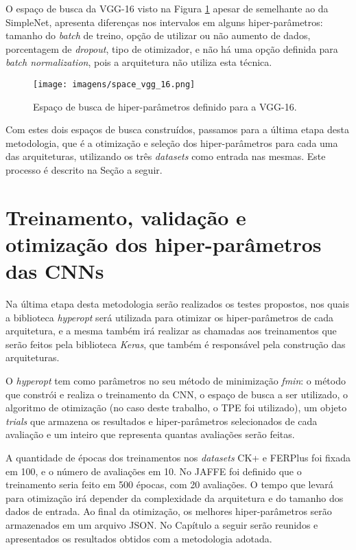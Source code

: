 \documentclass[
12pt,       %
openright,      %
oneside,      %
a4paper,      %
english,      %
french,       %
spanish,      %
brazil        %
]{abntex2}
\begin{document}
O espaço de busca da VGG-16 visto na Figura \ref{fig:space_vgg_16} apesar de semelhante ao da SimpleNet, apresenta diferenças nos intervalos em alguns hiper-parâmetros: tamanho do \textit{batch} de treino, opção de utilizar ou não aumento de dados, porcentagem de \textit{dropout}, tipo de otimizador, e não há uma opção definida para \textit{batch normalization}, pois a arquitetura não utiliza esta técnica.

\begin{figure}[ht]
\centering
\caption{Espaço de busca de hiper-parâmetros definido para a VGG-16.}
\texttt{[image: imagens/space\_vgg\_16.png]}
\label{fig:space_vgg_16}
\end{figure}

Com estes dois espaços de busca construídos, passamos para a última etapa desta metodologia, que é a otimização e seleção dos hiper-parâmetros para cada uma das arquiteturas, utilizando os três \textit{datasets} como entrada nas mesmas. Este processo é descrito na Seção a seguir.

\section{Treinamento, validação e otimização dos hiper-parâmetros das CNNs} \label{trein-valid-otimizacao}

Na última etapa desta metodologia serão realizados os testes propostos, nos quais a biblioteca \textit{hyperopt} será utilizada para otimizar os hiper-parâmetros de cada arquitetura, e a mesma também irá realizar as chamadas aos treinamentos que serão feitos pela biblioteca \textit{Keras}, que também é responsável pela construção das arquiteturas. 

O \textit{hyperopt} tem como parâmetros no seu método de minimização \textit{fmin}: o método que constrói e realiza o treinamento da CNN, o espaço de busca a ser utilizado, o algoritmo de otimização (no caso deste trabalho, o TPE foi utilizado), um objeto \textit{trials} que armazena os resultados e hiper-parâmetros selecionados de cada avaliação e um inteiro que representa quantas avaliações serão feitas.

A quantidade de épocas dos treinamentos nos \textit{datasets} CK+ e FERPlus foi fixada em 100, e o número de avaliações em 10. No JAFFE foi definido que o treinamento seria feito em 500 épocas, com 20 avaliações. O tempo que levará para otimização irá depender da complexidade da arquitetura e do tamanho dos dados de entrada. Ao final da otimização, os melhores hiper-parâmetros serão armazenados em um arquivo JSON. No Capítulo a seguir serão reunidos e apresentados os resultados obtidos com a metodologia adotada.
\end{document}
